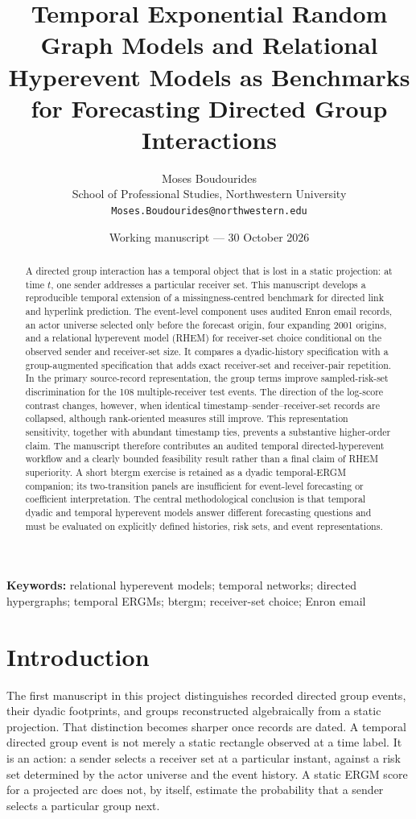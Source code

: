 \documentclass[11pt]{article}
\title{Temporal Exponential Random Graph Models and Relational Hyperevent Models as Benchmarks for Forecasting Directed Group Interactions}
\author{Moses Boudourides\\School of Professional Studies, Northwestern University\\\texttt{Moses.Boudourides@northwestern.edu}}
\date{Working manuscript --- 30 October 2026}
\begin{document}
\maketitle

\begin{abstract}
A directed group interaction has a temporal object that is lost in a static projection: at time $t$, one sender addresses a particular receiver set. This manuscript develops a reproducible temporal extension of a missingness-centred benchmark for directed link and hyperlink prediction. The event-level component uses audited Enron email records, an actor universe selected only before the forecast origin, four expanding 2001 origins, and a relational hyperevent model (RHEM) for receiver-set choice conditional on the observed sender and receiver-set size. It compares a dyadic-history specification with a group-augmented specification that adds exact receiver-set and receiver-pair repetition. In the primary source-record representation, the group terms improve sampled-risk-set discrimination for the 108 multiple-receiver test events. The direction of the log-score contrast changes, however, when identical timestamp--sender--receiver-set records are collapsed, although rank-oriented measures still improve. This representation sensitivity, together with abundant timestamp ties, prevents a substantive higher-order claim. The manuscript therefore contributes an audited temporal directed-hyperevent workflow and a clearly bounded feasibility result rather than a final claim of RHEM superiority. A short btergm exercise is retained as a dyadic temporal-ERGM companion; its two-transition panels are insufficient for event-level forecasting or coefficient interpretation. The central methodological conclusion is that temporal dyadic and temporal hyperevent models answer different forecasting questions and must be evaluated on explicitly defined histories, risk sets, and event representations.
\end{abstract}

\noindent\textbf{Keywords:} relational hyperevent models; temporal networks; directed hypergraphs; temporal ERGMs; btergm; receiver-set choice; Enron email

\section{Introduction}\label{sec:introduction}

The first manuscript in this project distinguishes recorded directed group events, their dyadic footprints, and groups reconstructed algebraically from a static projection. That distinction becomes sharper once records are dated. A temporal directed group event is not merely a static rectangle observed at a time label. It is an action: a sender selects a receiver set at a particular instant, against a risk set determined by the actor universe and the event history. A static ERGM score for a projected arc does not, by itself, estimate the probability that a sender selects a particular group next.
\end{document}
